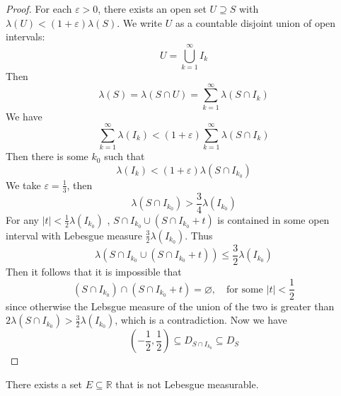 \documentclass[../main.tex]{subfiles}
\begin{document}
\begin{proof}
    For each \(   \varepsilon > 0  \), there exists an open set \(  U\supseteq S  \) with \(   \lambda \left( U \right)< \left( 1+  \varepsilon  \right) \lambda \left( S \right)     \). We write \(  U  \) as a countable disjoint union of open intervals: \[
    U = \bigcup _{k = 1}^{\infty}I_{k}
    \]Then \[
     \lambda \left( S \right)=  \lambda \left( S\cap U \right)= \sum _{k = 1}^{\infty} \lambda \left( S\cap I_{k} \right)   
    \] We have \[
    \sum _{k = 1}^{\infty} \lambda \left( I_{k} \right) < \left( 1+  \varepsilon  \right) \sum _{k= 1}^{\infty} \lambda \left( S\cap I_{k} \right)   
    \] Then there is some \(   k_0 \) such that \[
     \lambda \left( I_{k} \right)< \left( 1+  \varepsilon  \right) \lambda \left( S\cap I_{k_0} \right)   
    \]     We take \(   \varepsilon = \frac{1 }{3 }   \), then \[
     \lambda \left( S\cap I_{k_0} \right)> \frac{3 }{4 }  \lambda \left( I_{k_0} \right)   
    \] For any \(  \left| t \right|< \frac{1 }{2 }   \lambda \left( I_{k_0} \right)   \) , \(  S\cap I_{k_0}\cup \left( S\cap I_{k_0}+ t \right)   \) is contained in some open interval with Lebesgue measure \(  \frac{3}{2} \lambda \left( I_{k_0} \right)   \). Thus \[
     \lambda \left( S\cap I_{k_0}\cup \left( S\cap I_{k_0}+ t \right)  \right)\le \frac{3 }{2 } \lambda \left( I_{k_0} \right)   
    \]  Then it follows that it is impossible that \[
    \left( S\cap I_{k_0} \right)\cap \left( S\cap I_{k_0}+ t \right)= \varnothing ,\quad \text{for some }  \left| t \right|< \frac{1 }{2 }  
    \]since otherwise the Lebsgue measure of the union of the two is  greater than \(  2  \lambda \left( S\cap I_{k_0} \right)> \frac{3 }{2 } \lambda \left( I_{k_0} \right)     \), which is a contradiction. Now we have \[
    \left( -\frac{1}{2},\frac{1}{2} \right)\subseteq  D_{S\cap I_{k_0}}\subseteq D_{S} 
    \]
\end{proof}

\begin{exercise}{}{}
    There exists a set \(  E\subseteq \mathbb{R}   \)  that is not Lebesgue measurable. 
\end{exercise}
\end{document}
